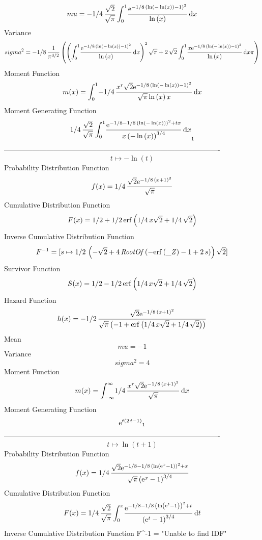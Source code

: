 \documentclass[12pt]{article}
\begin{document}
 $$ mu=-1/4\,{\frac {\sqrt {2}}{\sqrt {\pi}}\int_{0}^{1}\!{\frac {{{\rm e}^{-
1/8\, \left( \ln  \left( -\ln  \left( x \right)  \right) -1 \right) ^{
2}}}}{\ln  \left( x \right) }}\,{\rm d}x}
$$ Variance 
 $$ sigma^2 = -1/8\,{\frac {1}{{\pi}^{3/2}} \left(  \left( \int_{0}^{1}\!{\frac {{
{\rm e}^{-1/8\, \left( \ln  \left( -\ln  \left( x \right)  \right) -1
 \right) ^{2}}}}{\ln  \left( x \right) }}\,{\rm d}x \right) ^{2}\sqrt 
{\pi}+2\,\sqrt {2}\int_{0}^{1}\!{\frac {x{{\rm e}^{-1/8\, \left( \ln 
 \left( -\ln  \left( x \right)  \right) -1 \right) ^{2}}}}{\ln 
 \left( x \right) }}\,{\rm d}x\pi \right) }
$$Moment Function 
 $$ m(x) = \int_{0}^{1}\!-1/4\,{\frac {{x}^{r}\sqrt {2}{{\rm e}^{-1/8\, \left( 
\ln  \left( -\ln  \left( x \right)  \right) -1 \right) ^{2}}}}{\sqrt {
\pi}\ln  \left( x \right) x}}\,{\rm d}x
$$ Moment Generating Function 
 $$1/4\,{\frac {\sqrt {2}}{\sqrt {\pi}}\int_{0}^{1}\!{\frac {{{\rm e}^{-1
/8-1/8\, \left( \ln  \left( -\ln  \left( x \right)  \right)  \right) ^
{2}+tx}}}{x \left( -\ln  \left( x \right)  \right) ^{3/4}}}\,{\rm d}x}
_{{1}}
$$-------------------------------------------------------------------------------------------  \\$$t\mapsto -\ln  \left( t \right) 
$$Probability Distribution Function 
$$  f(x)=1/4\,{\frac {\sqrt {2}{{\rm e}^{-1/8\, \left( x+1 \right) ^{2}}}}{
\sqrt {\pi}}}
$$Cumulative Distribution Function  
 $$F(x)=1/2+1/2\,{\rm erf} \left(1/4\,x\sqrt {2}+1/4\,\sqrt {2}\right)
$$ Inverse Cumulative Distribution Function 
  $$F^{-1} = [s\mapsto 1/2\, \left( -\sqrt {2}+4\,{\it RootOf} \left( -{\rm erf} 
\left({\it \_Z}\right)-1+2\,s \right)  \right) \sqrt {2}]
$$Survivor Function 
 $$ S(x)=1/2-1/2\,{\rm erf} \left(1/4\,x\sqrt {2}+1/4\,\sqrt {2}\right)
$$ Hazard Function 
 $$ h(x)=-1/2\,{\frac {\sqrt {2}{{\rm e}^{-1/8\, \left( x+1 \right) ^{2}}}}{
\sqrt {\pi} \left( -1+{\rm erf} \left(1/4\,x\sqrt {2}+1/4\,\sqrt {2}
\right) \right) }}
$$Mean 
 $$ mu=-1
$$ Variance 
 $$ sigma^2 = 4
$$Moment Function 
 $$ m(x) = \int_{-\infty }^{\infty }\!1/4\,{\frac {{x}^{r}\sqrt {2}{{\rm e}^{-1/8
\, \left( x+1 \right) ^{2}}}}{\sqrt {\pi}}}\,{\rm d}x
$$ Moment Generating Function 
 $${{\rm e}^{t \left( 2\,t-1 \right) }}_{{1}}
$$-------------------------------------------------------------------------------------------  \\$$t\mapsto \ln  \left( t+1 \right) 
$$Probability Distribution Function 
$$  f(x)=1/4\,{\frac {\sqrt {2}{{\rm e}^{-1/8-1/8\, \left( \ln  \left( {{\rm e}
^{x}}-1 \right)  \right) ^{2}+x}}}{\sqrt {\pi} \left( {{\rm e}^{x}}-1
 \right) ^{3/4}}}
$$Cumulative Distribution Function  
 $$F(x)=1/4\,{\frac {\sqrt {2}}{\sqrt {\pi}}\int_{0}^{x}\!{\frac {{{\rm e}^{-1
/8-1/8\, \left( \ln  \left( {{\rm e}^{t}}-1 \right)  \right) ^{2}+t}}
}{ \left( {{\rm e}^{t}}-1 \right) ^{3/4}}}\,{\rm d}t}
$$ Inverse Cumulative Distribution Function 
  $$F^{-1} =                             "Unable to find IDF"
\end{document}
